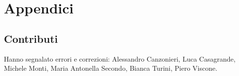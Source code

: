 \documentclass[italian,a4paper,oneside,headinclude]{scrbook}
\begin{document}
\backmatter
\chapter{Appendici}


\section{Contributi}

Hanno segnalato errori e correzioni:
Alessandro Canzonieri,
Luca Casagrande,
Michele Monti,
Maria Antonella Secondo,
Bianca Turini,
Piero Viscone.
% 
% 

\printindex
\end{document}
